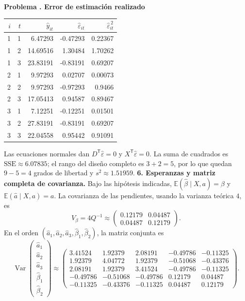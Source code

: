 \documentclass[11pt,a4paper]{article}
\newcommand{\E}{\mathbb E}
\newcommand{\T}{^{\mathsf T}}
\DeclareMathOperator{\Var}{Var}
\theoremstyle{definition}
\newcounter{problema}
\newenvironment{resuelto}[1]{\refstepcounter{problema}\par\medskip\Needspace{6\baselineskip}\textbf{Problema \theproblema. #1}\par}{\par\medskip}
\newcommand{\eps}{\varepsilon}
\begin{document}
\begin{resuelto}{Error de estimación realizado}
\begin{center}\small
\begin{tabular}{rrrrr}
\toprule
$i$&$t$&$\widehat y_{it}$&$\widehat\eps_{it}$&$\widehat\eps_{it}^{\,2}$\\
\midrule
1&1&6.47293&-0.47293&0.22367\\
1&2&14.69516&1.30484&1.70262\\
1&3&23.83191&-0.83191&0.69207\\
2&1&9.97293&0.02707&0.00073\\
2&2&9.97293&-0.97293&0.9466\\
2&3&17.05413&0.94587&0.89467\\
3&1&7.12251&-0.12251&0.01501\\
3&2&27.83191&-0.83191&0.69207\\
3&3&22.04558&0.95442&0.91091\\
\bottomrule
\end{tabular}
\end{center}
Las ecuaciones normales dan $D\T\widehat\eps=0$ y $X\T\widehat\eps=0$. La suma de cuadrados es $\mathrm{SSE}\approx6.07835$; el rango del diseño completo es $3+2=5$, por lo que quedan $9-5=4$ grados de libertad y $s^2\approx1.51959$.
\textbf{6. Esperanzas y matriz completa de covarianza.} Bajo las hipótesis indicadas, $\E(\widehat\beta\mid X,a)=\beta$ y $\E(\widehat a\mid X,a)=a$. La covarianza de las pendientes, usando la varianza teórica $4$, es
\[
V_\beta=4Q^{-1}\approx\begin{pmatrix}
0.12179&0.04487\\0.04487&0.12179
\end{pmatrix}.
\]
En el orden $(\widehat a_1,\widehat a_2,\widehat a_3,\widehat\beta_1,\widehat\beta_2)$, la matriz conjunta es
\[
\Var\begin{pmatrix}\widehat a_1\\\widehat a_2\\\widehat a_3\\\widehat\beta_1\\\widehat\beta_2\end{pmatrix}
\approx\begin{pmatrix}
3.41524&1.92379&2.08191&-0.49786&-0.11325\\1.92379&4.04772&1.92379&-0.51068&-0.43376\\2.08191&1.92379&3.41524&-0.49786&-0.11325\\-0.49786&-0.51068&-0.49786&0.12179&0.04487\\-0.11325&-0.43376&-0.11325&0.04487&0.12179
\end{pmatrix}.
\]
\end{resuelto}
\end{document}
